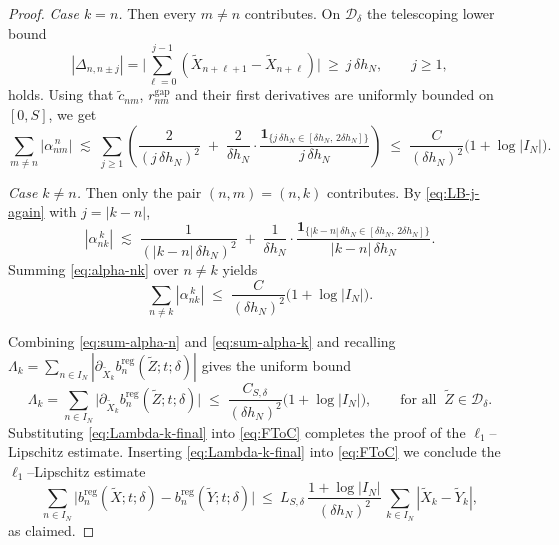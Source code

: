 \documentclass[12pt,reqno]{amsart}
\theoremstyle{plain}
\theoremstyle{definition}
\theoremstyle{remark}
\begin{document}
\begin{proof}
\medskip\noindent
\emph{Case $k=n$.} Then every $m\neq n$ contributes. On $\mathcal D_\delta$ the
telescoping lower bound
\begin{equation}\label{eq:LB-j-again}
|\Delta_{n,n\pm j}|=\Big|\sum_{\ell=0}^{j-1}
(\widetilde X_{n+\ell+1}-\widetilde X_{n+\ell})\Big|
\ \ge\ j\,\delta h_N,\qquad j\ge 1,
\end{equation}
holds. Using that $\widetilde c_{nm}$, $r^{\mathrm{gap}}_{nm}$ and their first
derivatives are uniformly bounded on $[0,S]$, we get
\begin{equation}\label{eq:sum-alpha-n}
\sum_{m\neq n}\!|\alpha_{n m}^{\,n}|
\;\lesssim\; \sum_{j\ge1}\!\left(\frac{2}{(j\,\delta h_N)^2}
\;+\;\frac{2}{\delta h_N}\cdot
\frac{\mathbf 1_{\{j\,\delta h_N\in[\delta h_N,\,2\delta h_N]\}}}{j\,\delta h_N}\right)
\;\le\; \frac{C}{(\delta h_N)^2}\Big(1+\log |I_N|\Big).
\end{equation}

\medskip\noindent
\emph{Case $k\neq n$.} Then only the pair $(n,m)=(n,k)$ contributes. By
\eqref{eq:LB-j-again} with $j=|k-n|$,
\begin{equation}\label{eq:alpha-nk}
|\alpha_{n k}^{\,k}|
\;\lesssim\; \frac{1}{(|k-n|\,\delta h_N)^2}
\;+\;\frac{1}{\delta h_N}\cdot
\frac{\mathbf 1_{\{|k-n|\,\delta h_N\in[\delta h_N,\,2\delta h_N]\}}}{|k-n|\,\delta h_N}.
\end{equation}
Summing \eqref{eq:alpha-nk} over $n\neq k$ yields
\begin{equation}\label{eq:sum-alpha-k}
\sum_{n\neq k}\!|\alpha_{n k}^{\,k}|
\;\le\; \frac{C}{(\delta h_N)^2}\Big(1+\log |I_N|\Big).
\end{equation}

\medskip
Combining \eqref{eq:sum-alpha-n} and \eqref{eq:sum-alpha-k} and recalling
$\Lambda_k=\sum_{n\in I_N}|\partial_{\widetilde X_k}
b^{\mathrm{reg}}_{n}(\widetilde Z;t;\delta)|$ gives the uniform bound
\begin{equation}\label{eq:Lambda-k-final}
\Lambda_k
=\sum_{n\in I_N}\big|\partial_{\widetilde X_k} b^{\mathrm{reg}}_{n}(\widetilde Z;t;\delta)\big|
\;\le\; \frac{C_{S,\delta}}{(\delta h_N)^2}\Big(1+\log |I_N|\Big),
\qquad \text{for all }\ \widetilde Z\in\mathcal D_\delta.
\end{equation}
Substituting \eqref{eq:Lambda-k-final} into \eqref{eq:FToC} completes the proof
of the $\ell_1$–Lipschitz estimate.
 Inserting \eqref{eq:Lambda-k-final} into \eqref{eq:FToC} we conclude the
\(\ell_1\)–Lipschitz estimate
\begin{equation}
\sum_{n\in I_N}\big|b^{\mathrm{reg}}_{n}(\widetilde X;t;\delta)
-b^{\mathrm{reg}}_{n}(\widetilde Y;t;\delta)\big|
\ \le\ L_{S,\delta}\,
\frac{1+\log |I_N|}{(\delta h_N)^2}\,
\sum_{k\in I_N}|\widetilde X_k-\widetilde Y_k|,
\end{equation}
as claimed.
\end{proof}
\end{document}
